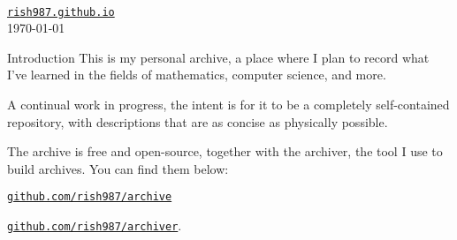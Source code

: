 \begin{center}
  {\LARGE {}}\\
  \vspace{10pt}
  \large 
  \href{https://rish987.github.io/}{\tt {rish987.github.io}}\\
  \vspace{7pt}
  \today
\end{center}
\begin{part}{Introduction}
  This is my personal archive,
  a place where I plan to record
  what I've learned in the fields of 
  mathematics, computer science, and more.

  A continual work in progress, the intent is 
  for it to be a completely self-contained repository,
  with descriptions that are as concise as physically possible.

  The archive is free and open-source, 
  together with the archiver, the tool I use to build archives.
  You can find them below:

  \href{https://github.com/rish987/archive}{\tt github.com/rish987/archive}

  \href{https://github.com/rish987/archiver}{\tt github.com/rish987/archiver}.

\end{part}

